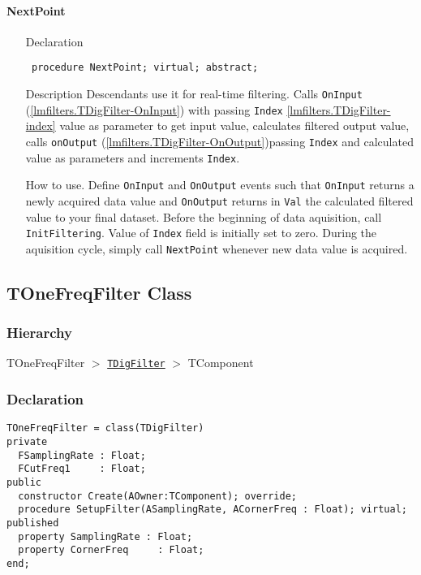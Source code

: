 \documentclass[12pt,a4paper,oneside]{report}
\newcommand{\declarationitem}[1]{{\addfontfeatures{FakeSlant} #1}}
\newcommand{\descriptiontitle}[1]{{\addfontfeatures{FakeSlant}#1}}
\newcommand{\code}[1]{\texttt{#1}}
\begin{document}
\paragraph{NextPoint}
\label{lmfilters.TDigFilter-NextPoint}
\begin{itemize}\item[\declarationitem{Declaration}\hfill]
	\begin{flushleft}
		\code{
			procedure NextPoint; virtual; abstract;}
	\end{flushleft}
	\item[\descriptiontitle{Description}] Descendants use it for real-time filtering. Calls \code{OnInput} (\ref{lmfilters.TDigFilter-OnInput}) with passing \code{Index} \ref{lmfilters.TDigFilter-index} value as parameter to get input value, calculates filtered output value, calls \code{onOutput} (\ref{lmfilters.TDigFilter-OnOutput})passing \code{Index} and calculated value as parameters and increments \code{Index}.
	\item[\descriptiontitle{How to use.}] Define \code{OnInput} and \code{OnOutput} events such that \code{OnInput} returns a newly acquired data value and \code{OnOutput} returns in \code{Val} the calculated filtered value to your final dataset. Before the beginning of data aquisition, call \code{InitFiltering}. Value of \code{Index} field is initially set to zero. During the aquisition cycle, simply call \code{NextPoint} whenever new data value is acquired. 
\end{itemize}

\subsection{TOneFreqFilter Class}
\label{lmfilters.TOneFreqFilter}
\subsubsection{Hierarchy}
TOneFreqFilter {$>$} \hyperref[lmfilters.TDigFilter]{\code{TDigFilter}} {$>$} TComponent
\subsubsection{Declaration}
\begin{verbatim}
TOneFreqFilter = class(TDigFilter)
private
  FSamplingRate : Float;
  FCutFreq1     : Float;
public
  constructor Create(AOwner:TComponent); override;
  procedure SetupFilter(ASamplingRate, ACornerFreq : Float); virtual;
published
  property SamplingRate : Float;
  property CornerFreq     : Float;
end;
\end{verbatim}
\end{document}
